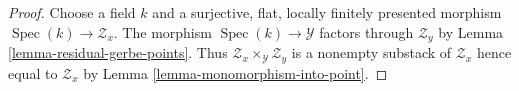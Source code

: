 \documentclass[10pt,a4paper]{amsart}
\theoremstyle{plain}
\theoremstyle{definition}
\theoremstyle{remark}
\numberwithin{equation}{subsection}
\def\Spec{\mathop{\mathrm{Spec}}}
\begin{document}
\begin{proof}
Choose a field $k$ and a surjective, flat, locally finitely presented
morphism $\Spec(k) \to \mathcal{Z}_x$. The morphism
$\Spec(k) \to \mathcal{Y}$ factors through $\mathcal{Z}_y$ by
Lemma \ref{lemma-residual-gerbe-points}.
Thus $\mathcal{Z}_x \times_\mathcal{Y} \mathcal{Z}_y$
is a nonempty substack of $\mathcal{Z}_x$
hence equal to $\mathcal{Z}_x$ by Lemma \ref{lemma-monomorphism-into-point}.
\end{proof}
\end{document}
